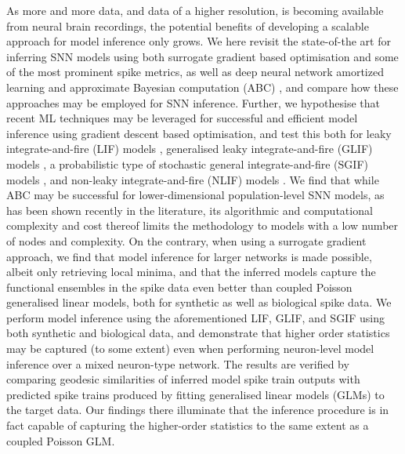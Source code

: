 \documentclass[mphil,deptreport,ianc]{infthesis} %
\begin{document}
As more and more data, and data of a higher resolution, is becoming available from neural brain recordings, the potential benefits of developing a scalable approach for model inference only grows.
We here revisit the state-of-the art for inferring SNN models using both surrogate gradient based optimisation and some of the most prominent spike metrics, as well as deep neural network amortized learning and approximate Bayesian computation (ABC) \cite{Lueckmann2017, Lueckmann2018}, and compare how these approaches may be employed for SNN inference. Further, we hypothesise that recent ML techniques may be leveraged for successful and efficient model inference using gradient descent based optimisation, and test this both for leaky integrate-and-fire (LIF) models \cite{Rolls1998Book, Dayan2001, Paninski2004, Burkitt2006}, generalised leaky integrate-and-fire (GLIF) models \cite{allen_glif_white_paper, Teeter2018a}, a probabilistic type of stochastic general integrate-and-fire (SGIF) models \cite{Rene2020, Schwalger2017}, and non-leaky integrate-and-fire (NLIF) models \cite{Huh2018}.
We find that while ABC may be successful for lower-dimensional population-level SNN models, as has been shown recently in the literature, its algorithmic and computational complexity and cost thereof limits the methodology to models with a low number of nodes and complexity.
On the contrary, when using a surrogate gradient approach, we find that model inference for larger networks is made possible, albeit only retrieving local minima, and that the inferred models capture the functional ensembles in the spike data even better than coupled Poisson generalised linear models, both for synthetic as well as biological spike data.
We perform model inference using the aforementioned LIF, GLIF, and SGIF using both synthetic and biological data, and demonstrate that higher order statistics may be captured (to some extent) even when performing neuron-level model inference over a mixed neuron-type network.
The results are verified by comparing geodesic similarities of inferred model spike train outputs with predicted spike trains produced by fitting generalised linear models (GLMs) to the target data.
Our findings there illuminate that the inference procedure is in fact capable of capturing the higher-order statistics to the same extent as a coupled Poisson GLM.
\end{document}
